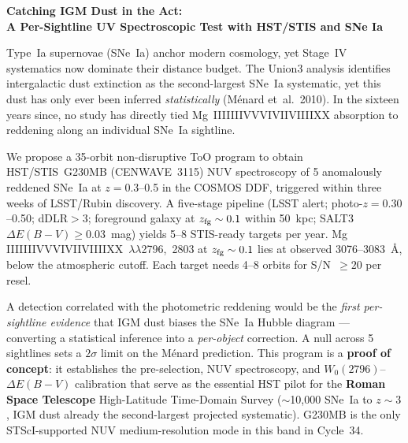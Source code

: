 \documentclass[11pt]{article}
\makeatletter
\newcommand{\@ROMANNUM}[1]{%
  \ifcase#1\or I\or II\or III\or IV\or V\or VI\or VII\or VIII\or IX\or X\fi}
\providecommand{\ion}[2]{#1\,\@ROMANNUM{#2}}
\makeatother
\begin{document}
\begin{center}
{\Large\bfseries Catching IGM Dust in the Act:}\\[2pt]
{\large\bfseries A Per-Sightline UV Spectroscopic Test with HST/STIS and SNe Ia}
\end{center}

\vspace{1em}

\noindent
Type~Ia supernovae (SNe~Ia) anchor modern cosmology, yet Stage~IV
systematics now dominate their distance budget. The Union3 analysis
identifies intergalactic dust extinction as the second-largest SNe~Ia
systematic, yet this dust has only ever been inferred
\emph{statistically} (M\'enard et~al.\ 2010). In the sixteen years
since, no study has directly tied \ion{Mg}{2} absorption to reddening
along an individual SNe~Ia sightline.

\begin{sloppypar}
We propose a 35-orbit non-disruptive ToO program to obtain
HST/STIS~G230MB (CENWAVE~3115) NUV spectroscopy of 5 anomalously
reddened SNe~Ia at $z=0.3$--0.5 in the COSMOS DDF, triggered within
three weeks of LSST/Rubin discovery. A five-stage pipeline (LSST
alert; photo-$z=0.30$--0.50; dDLR$>3$; foreground galaxy at
$z_{\rm fg}\sim0.1$ within 50~kpc; SALT3
$\Delta E(B{-}V)\geq0.03$~mag) yields 5--8 STIS-ready targets per
year. \ion{Mg}{2}~$\lambda\lambda$2796,~2803 at
$z_{\rm fg}\sim0.1$ lies at observed 3076--3083~\AA, below the
atmospheric cutoff. Each target needs 4--8 orbits for S/N~$\geq20$
per resel.
\end{sloppypar}

A detection correlated with the photometric reddening would be the
\emph{first per-sightline evidence} that IGM dust biases the SNe~Ia
Hubble diagram --- converting a statistical inference into a
\emph{per-object} correction. A null across 5 sightlines sets a
$2\sigma$ limit on the M\'enard prediction. This program is a
\textbf{proof of concept}: it establishes the pre-selection, NUV
spectroscopy, and $W_0(2796)$--$\Delta E(B{-}V)$ calibration that
serve as the essential HST pilot for the \textbf{Roman Space
Telescope} High-Latitude Time-Domain Survey ($\sim$10{,}000 SNe~Ia
to $z\sim3$, IGM dust already the second-largest projected
systematic). G230MB is the only STScI-supported NUV medium-resolution
mode in this band in Cycle~34.
\end{document}
